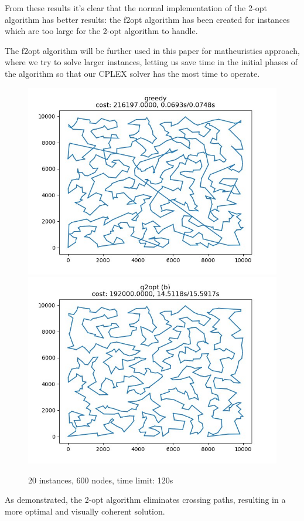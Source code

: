 From these results it's clear that the normal implementation of the 2-opt algorithm has better results: the f2opt algorithm has been created for instances which are too large for the 2-opt algorithm to handle.

The f2opt algorithm will be further used in this paper for matheuristics approach, where we try to solve larger instances, letting us save time in the initial phases of the algorithm so that our CPLEX solver has the most time to operate.

\begin{figure}[h]
    \centering
    \includegraphics*[width=.45\textwidth]{../solutions/1_600_greedy.jpg}
    \includegraphics*[width=.45\textwidth]{../solutions/1_600_g2opt.jpg}
    \caption*{20 instances, 600 nodes, time limit: 120s}
\end{figure}

As demonstrated, the 2-opt algorithm eliminates crossing paths, resulting in a more optimal and visually coherent solution.